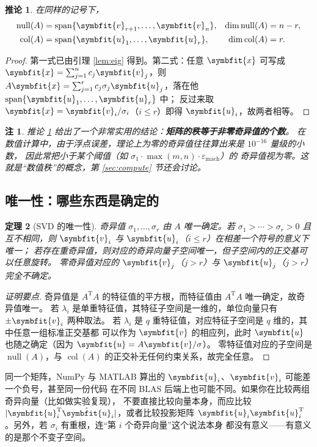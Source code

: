 \documentclass[UTF8, 11pt, a4paper, fontset=windows]{ctexart}
\theoremstyle{cnthm}
\newtheorem{thm}{定理}[section]
\newtheorem{cor}[thm]{推论}
\theoremstyle{cndef}
\newtheorem{rem}[defn]{注}
\newcommand{\T}{^{\mathrm{T}}}
\newcommand{\abs}[1]{\lvert #1 \rvert}
\DeclareMathOperator{\Span}{span}
\DeclareMathOperator{\Null}{null}
\DeclareMathOperator{\Col}{col}
\newcommand{\bu}{\symbfit{u}}
\newcommand{\x}{\symbfit{x}}
\newcommand{\vv}{\symbfit{v}}
\begin{document}
\begin{cor}\label{cor:null}
在同样的记号下，
\begin{align}
  \Null(A)&=\Span\{\vv_{r+1},\dots,\vv_n\}, & \dim\Null(A)&=n-r,\\
  \Col(A)&=\Span\{\bu_1,\dots,\bu_r\}, & \dim\Col(A)&=r .
\end{align}
\end{cor}

\begin{proof}
第一式已由引理 \ref{lem:eig} 得到。第二式：任意 $\x$ 可写成
$\x=\sum_{j=1}^{n}c_j\vv_j$，则
$A\x=\sum_{j=1}^{r}c_j\sigma_j\bu_j$，落在他 $\Span\{\bu_1,\dots,\bu_r\}$ 中；
反过来取 $\x=\vv_i/\sigma_i$（$i\le r$）即得 $\bu_i$，故两者相等。
\end{proof}

\begin{rem}
推论 \ref{cor:null} 给出了一个非常实用的结论：\textbf{矩阵的秩等于非零奇异值的个数}。
在数值计算中，由于浮点误差，理论上为零的奇异值往往算出来是 $10^{-16}$ 量级的小数，
因此常把小于某个阈值（如 $\sigma_1\cdot\max(m,n)\cdot\varepsilon_{\text{mach}}$）的
奇异值视为零。这就是“数值秩”的概念，第 \ref{sec:compute} 节还会讨论。
\end{rem}

\subsection{唯一性：哪些东西是确定的}\label{sec:unique}

\begin{thm}[SVD 的唯一性]\label{thm:unique}
奇异值 $\sigma_1,\dots,\sigma_r$ 由 $A$ 唯一确定。若 $\sigma_1>\cdots>\sigma_r>0$
且互不相同，则 $\vv_i$ 与 $\bu_i$（$i\le r$）在相差一个符号的意义下唯一；
若存在重奇异值，则对应的奇异向量子空间唯一，但子空间内的正交基可以任意旋转。
零奇异值对应的 $\vv_j$（$j>r$）与 $\bu_j$（$j>r$）完全不确定。
\end{thm}

\begin{proof}[证明要点]
奇异值是 $A\T A$ 的特征值的平方根，而特征值由 $A\T A$ 唯一确定，故奇异值唯一。
若 $\lambda_i$ 是单重特征值，其特征子空间是一维的，单位向量只有 $\pm\vv_i$ 两种取法。
若 $\lambda_i$ 是 $q$ 重特征值，对应特征子空间是 $q$ 维的，其中任意一组标准正交基都
可以作为 $\vv$ 的相应列，此时 $\bu$ 也随之确定（因为 $\bu=A\vv/\sigma$）。
零特征值对应的子空间是 $\Null(A)$，与 $\Col(A)$ 的正交补无任何约束关系，故完全任意。
\end{proof}

\begin{warnbox}[符号不确定性会带来麻烦]
同一个矩阵，NumPy 与 MATLAB 算出的 $\bu_i$、$\vv_i$ 可能差一个负号，甚至同一份代码
在不同 BLAS 后端上也可能不同。如果你在比较两组奇异向量（比如做实验复现），
不要直接比较向量本身，而应比较 $\abs{\bu_i\T\hat{\bu}_i}$，或者比较投影矩阵
$\bu_i\bu_i\T$。另外，若 $\sigma_i$ 有重根，连“第 $i$ 个奇异向量”这个说法本身
都没有意义——有意义的是那个不变子空间。
\end{warnbox}
\end{document}
